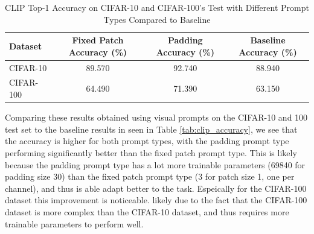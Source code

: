 \documentclass[a4paper]{article}
\begin{document}
\begin{table}[h]
    \centering
    \begin{tabular}{|l|c|c||c|}
    \hline
    \textbf{Dataset} & \textbf{Fixed Patch Accuracy (\%)} & \textbf{Padding Accuracy (\%)} & \textbf{Baseline Accuracy (\%)} \\ \hline
    CIFAR-10 & 89.570 & 92.740 & 88.940 \\ \hline
    CIFAR-100 & 64.490 & 71.390 & 63.150 \\ \hline
    \end{tabular}
    \caption{CLIP Top-1 Accuracy on CIFAR-10 and CIFAR-100's Test with Different Prompt Types Compared to Baseline}
    \label{tab:clip_accuracy_prompt_types}
\end{table}

Comparing these results obtained using visual prompts on the CIFAR-10 and 100 test set to the baseline results in
seen in Table \ref{tab:clip_accuracy}, we see that the accuracy is higher for both prompt types, with the padding
prompt type performing significantly better than the fixed patch prompt type. This is likely because the padding
prompt type has a lot more trainable parameters (69840 for padding size 30) than the fixed patch prompt type (3 for
patch size 1, one per channel), and thus is able adapt better to the task. Espeically for the CIFAR-100 dataset this
improvement is noticeable. likely due to the fact that the CIFAR-100 dataset is more complex than the CIFAR-10
dataset, and thus requires more trainable parameters to perform well.
\end{document}
